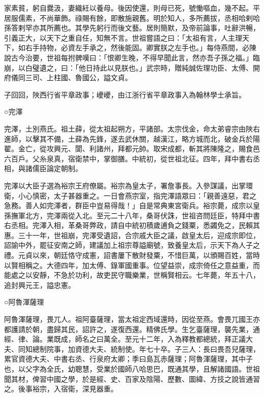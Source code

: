 \begin{pinyinscope}
 家素貧，躬自爨汲，妻織紝以養母。後因使還，則母已死，號慟嘔血，幾不起。平居服儒素，不尚華飾。祿賜有餘，即散施親舊。明於知人，多所薦拔，丞相哈剌哈孫答剌罕亦其所薦也。其學先躬行而後文藝。居則簡默，及帝前論事，吐辭洪暢，引義正大，以天下之重自任，知無不言。世祖嘗語之曰：「太祖有言，人主理天下，如右手持物，必資左手承之，然後能固。卿實朕之左手也。」每侍燕間，必陳說古今治要，世祖每拊髀嘆曰：「恨卿生晚，不得早聞此言，然亦吾子孫之福。」臨崩，以白璧遺之，曰：「他日持此以見朕也。」武宗時，贈純誠佐理功臣、太傅、開府儀同三司、上柱國、魯國公，謚文貞。



 子回回，陜西行省平章政事；巙巙，由江浙行省平章政事入為翰林學士承旨。



 ○完澤



 完澤，土別燕氏。祖土薛，從太祖起朔方，平諸部。太宗伐金，命太弟睿宗由陜右進師，以擊其不備，土薛為先鋒，遂去武休關，越漢江，略方城而北，破金兵於陽翟。金亡，從攻興元、閬、利諸州，拜都元帥。取宋成都，斬其將陳隆之，賜食邑六百戶。父糸泉真，宿衛禁中，掌御膳。中統初，從世祖北征。四年，拜中書右丞相，與諸儒臣論定朝制。



 完澤以大臣子選為裕宗王府僚屬。裕宗為皇太子，署詹事長。入參謀議，出掌環衛，小心慎密，太子甚器重之。一日會燕宗室，指完澤語眾曰：「親善遠惡，君之急務。善人如完澤者，群臣中豈易得哉！」自是常典東宮衛兵。裕宗薨，成宗以皇孫撫軍北方，完澤兩從入北。至元二十八年，桑哥伏誅，世祖咨問廷臣，特拜中書右丞相。完澤入相，革桑哥弊政，請自中統初積歲逋負之錢粟，悉蠲免之，民賴其惠。三十一年，世祖崩，完澤受遺詔，合宗戚大臣之議，啟皇太后，迎成宗即位，詔諭中外，罷征安南之師，建議加上祖宗尊謚廟號，致養皇太后，示天下為人子之禮。元貞以來，朝廷恪守成憲，詔書屢下散財發粟，不惜巨萬，以頒賜百姓，當時以賢相稱之。大德四年，加太傅、錄軍國重事。位望益崇，成宗倚任之意益重，而能處之以安靜，不急於功利，故吏民守職樂業，世稱賢相云。七年薨，年五十八，追封興元王，謚忠憲。



 ○阿魯渾薩理



 阿魯渾薩理，畏兀人。祖阿臺薩理，當太祖定西域還時，因從至燕。會畏兀國王亦都護請於朝，盡歸其民，詔許之，遂復西還。精佛氏學。生乞臺薩理，襲先業，通經、律、論。業既成，師名之曰萬全。至元十二年，入為釋教都總統，拜正議大夫、同知總制院事，加資德大夫、統制使。年七十卒。子三人：長曰畏吾兒薩理，累官資德大夫、中書右丞、行泉府太卿；季曰島瓦赤薩理；阿魯渾薩理，其中子也，以父字為全氏，幼聰慧，受業於國師八哈思巴，既通其學，且解諸國語。世祖聞其材，俾習中國之學，於是經、史、百家及陰陽、歷數、圖緯、方技之說皆通習之。後事裕宗，入宿衛，深見器重。




\end{pinyinscope}
